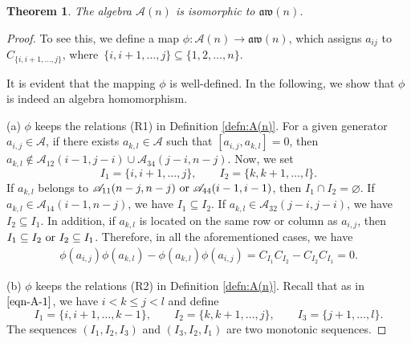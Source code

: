 \documentclass[10pt,a4paper]{amsart}
\numberwithin{equation}{section}
\def\lr#1{\left[#1\right]}
\def\A{\mathscr{A}}
\def\aw{\mathfrak{aw}}
\newtheorem{Theorem}{Theorem}[section]
\begin{document}
\begin{Theorem}
The algebra $\A(n)$ is isomorphic to $\aw(n)$.
\end{Theorem}
\begin{proof}
To see this, we define a map $\phi\colon \A(n) \rightarrow \aw(n)$, which assigns $a_{ij}$ to $C_{\{i, i+1, \dots, j\}}$, where~${\{i, i+1, \dots, j\}\subseteq\{1, 2, \dots, n\}}$.

It is evident that the mapping $\phi$ is well-defined.
In the following, we show that $\phi$ is indeed an algebra homomorphism.

(a) $\phi$ keeps the relations (R1) in Definition \ref{defn:A(n)}.
For a given generator $a_{i,j}\in \A$, if there exists $a_{k,l}\in \A$ such that $\lr{a_{i,j}, a_{k,l}}=0$, then $a_{k,l}\not\in \A_{12}(i-1,j-i)\cup \A_{34}(j-i,n-j)$.
Now, we set
\begin{equation*}
I_1=\{i, i+1, \dots, j\}, \qquad I_2=\{k, k+1, \dots, l\}.
\end{equation*}
If $a_{k,l}$ belongs to $\A_{11}(n-j,n-j) \hbox{ or } \A_{44}(i-1,i-1)$, then
$
I_1\cap I_2=\varnothing$.
If $a_{k,l} \in \A_{14}(i-1,n-j)$, we have
$
I_1 \subseteq I_2$.
If $a_{k,l} \in \A_{32}(j-i,j-i)$, we have
$
I_2 \subseteq I_1$.
In addition, if $a_{k,l}$ is located on the same row or column as $a_{i,j}$, then
$
I_1 \subseteq I_2 \hbox{ or } I_2 \subseteq I_1$.
Therefore, in all the aforementioned cases, we have
\begin{gather*}
 \phi(a_{i, j})\phi(a_{k, l})-\phi(a_{k, l})\phi(a_{i, j})
 =C_{I_1}C_{I_2}-C_{I_2}C_{I_1}
 =0.
\end{gather*}

(b) $\phi$ keeps the relations (R2) in Definition \ref{defn:A(n)}.
Recall that \smash{$\A_{i,k,j+1}^{k-1,j,l}$} as in $\eqref{eqn-A-1}$, we have $ i < k \leq j < l $ and define
 \begin{equation*}
 I_1=\{i, i+1, \dots, k-1\}, \qquad I_2=\{k, k+1, \dots, j\}, \qquad I_3=\{j+1, \dots, l\}.
 \end{equation*}
The sequences $(I_1, I_2, I_3)$ and $(I_3,I_2,I_1)$ are two monotonic sequences.


\end{proof}
\end{document}
